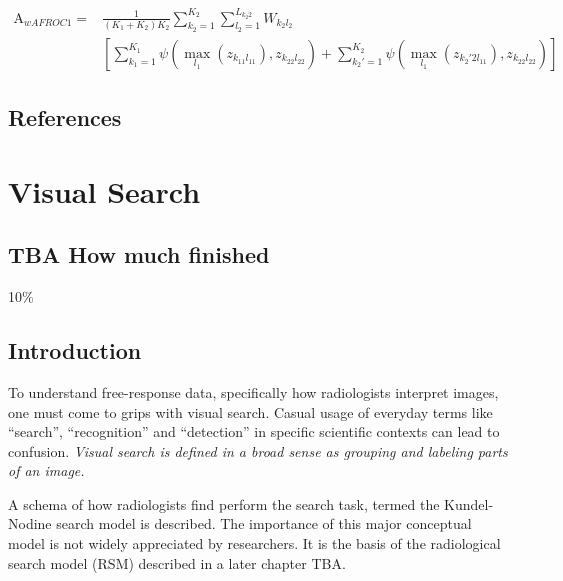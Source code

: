 \documentclass[
]{book}
\begin{document}
\begin{equation}
\begin{aligned}
\text{A}_{wAFROC1} =& \frac{1}{\left (K_1 + K_2 \right )K_2}\sum_{k_2=1}^{K_2}\sum_{l_2=1}^{L_{k_2 2}} W_{k_2l_2}\\
& \left[ \sum_{k_1=1}^{K_1}\psi\left ( \max_{l_1}\left (z_{k_11l_11}  \right ),z_{k_22l_22} \right ) + \sum_{k_2'=1}^{K_2}\psi\left ( \max_{l_1}\left (z_{k_2'2l_11}  \right ),z_{k_22l_22} \right )  \right ]
\end{aligned}
\label{eq:empirical-computational-wafroc1}
\end{equation}

\hypertarget{empirical-references}{%
\section{References}\label{empirical-references}}

\hypertarget{visual-search}{%
\chapter{Visual Search}\label{visual-search}}

\hypertarget{visual-search-how-much-finished}{%
\section{TBA How much finished}\label{visual-search-how-much-finished}}

10\%

\hypertarget{visual-search-intro}{%
\section{Introduction}\label{visual-search-intro}}

To understand free-response data, specifically how radiologists interpret images, one must come to grips with visual search. Casual usage of everyday terms like ``search'', ``recognition'' and ``detection'' in specific scientific contexts can lead to confusion.
\emph{Visual search is defined in a broad sense as grouping and labeling parts of an image.}

A schema of how radiologists find perform the search task, termed the Kundel-Nodine search model is described. The importance of this major conceptual model is not widely appreciated by researchers. It is the basis of the radiological search model (RSM) described in a later chapter TBA.
\end{document}
